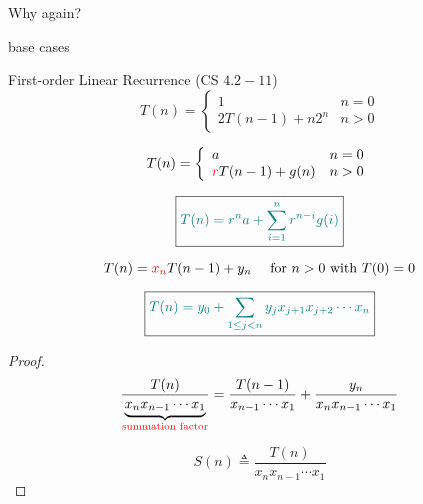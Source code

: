 
\begin{frame}{}
  \centerline{}

\end{frame}

\begin{frame}{}

  Why again?
\end{frame}

\begin{frame}{}

  base cases
\end{frame}

\begin{frame}{}
  \begin{exampleblock}{First-order Linear Recurrence (CS $4.2-11$)}
    \[
      T(n) = \left\{\begin{array}{lr}
	1		& n = 0 \\
	2T(n-1) + n 2^n & n > 0 
      \end{array}\right.
    \]
  \end{exampleblock}

  \pause
  \vspace{0.50cm}
  \begin{theorem}
    \[
      T(n) = \left\{\begin{array}{lr}
	a		& n = 0 \\
	\textcolor{red}{r}T(n-1) + g(n) & n > 0 
      \end{array}\right.
    \]

    \pause
    \vspace{0.30cm}
    \[
      \boxed{\textcolor{teal}{T(n) = r^n a + \sum_{i=1}^{n} r^{n-i} g(i)}}
    \]
  \end{theorem}
\end{frame}

\begin{frame}{}
  \begin{theorem}
    \[
      T(n) = \textcolor{red}{x_n} T(n-1) + y_n  \quad \text{ for } n > 0 \text{ with } T(0) = 0
    \]

    \[
      \boxed{\textcolor{teal}{T(n) = y_0 + \sum_{1 \le j < n} y_j x_{j+1} x_{j+2} \cdots x_n}}
    \]
  \end{theorem}

  \pause
  \begin{proof}
    \[
      \frac{T(n)}{\underbrace{x_n x_{n-1} \cdots x_1}_{\text{\textcolor{red}{summation factor}}}}
      	= \frac{T(n-1)}{x_{n-1} \cdots x_1} + \frac{y_n}{x_n x_{n-1} \cdots x_1}
    \]

    \pause
    \[
      S(n) \triangleq \frac{T(n)}{x_n x_{n-1} \cdots x_1}
    \]
  \end{proof}
\end{frame}

